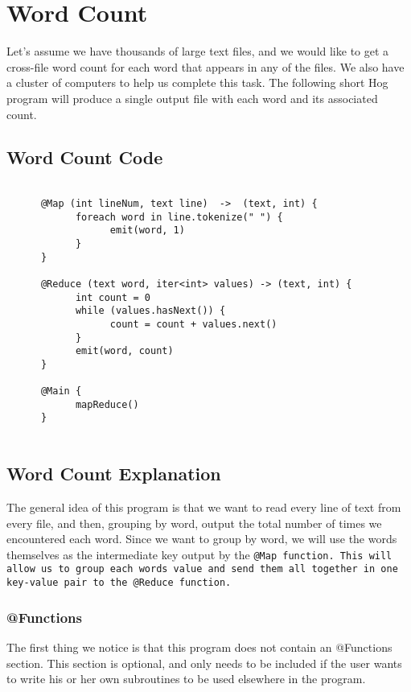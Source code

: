 \documentclass{article} \usepackage{fancyhdr, multicol}
\begin{document}
\section*{Word Count} 
\label{word_count} 

Let's assume we have thousands of large text files, and we would like to get a
cross-file word count for each word that appears in any of the files. We also have
a cluster of computers to help us complete this task. The following short Hog
program will produce a single output file with each word and its associated count.

\subsection*{Word Count Code}
\begin{verbatim}
      
      @Map (int lineNum, text line)  ->  (text, int) {
            foreach word in line.tokenize(" ") {
                  emit(word, 1)
            }
      }
      
      @Reduce (text word, iter<int> values) -> (text, int) {
            int count = 0
            while (values.hasNext()) {
                  count = count + values.next()
            }
            emit(word, count)
      }
      
      @Main {
            mapReduce()
      }
      
\end{verbatim}

\subsection*{Word Count Explanation}

The general idea of this program is that we want to read every line of text from
every file, and then, grouping by word, output the total number of times we
encountered each word. Since we want to group by word, we will use the words
themselves as the intermediate key output by the \tt @Map \rm function. This will
allow us to group each words value and send them all together in one key-value pair
to the \tt @Reduce \rm function.

\subsubsection*{@Functions}
The first thing we notice is that this program does not contain an @Functions section. This section is optional, and only needs to be included if the user wants to write his or her own subroutines to be used elsewhere in the program.
\end{document}
